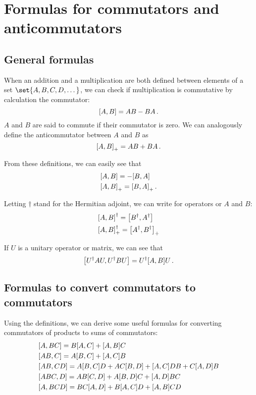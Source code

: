 \section{Formulas for commutators and anticommutators}
    \subsection{General formulas}
        When an addition and a multiplication are both defined between elements of a set $\set{A, B, C, D, \dots}$, we can check if multiplication is commutative by calculation the commutator:
        \begin{equation}
            \comm{A}{B} = AB - BA \thinspace .
        \end{equation}
        $A$ and $B$ are said to commute if their commutator is zero. We can analogously define the anticommutator between $A$ and $B$ as
        \begin{equation}
            \comm{A}{B}_+ = AB + BA \thinspace .
        \end{equation}

        From these definitions, we can easily see that
        \begin{align}
            & \comm{A}{B} = - \comm{B}{A} \\
            & \comm{A}{B}_+ = \comm{B}{A}_+ \thinspace .
        \end{align}

        Letting $\dagger$ stand for the Hermitian adjoint, we can write for operators or $A$ and $B$:
        \begin{align}
            & \comm{A}{B}^\dagger = \comm{B^\dagger}{A^\dagger} \\
            & \comm{A}{B}^\dagger_+ = \comm{A^\dagger}{B^\dagger}_+
        \end{align}

        If $U$ is a unitary operator or matrix, we can see that
        \begin{equation}
            \comm{U^\dagger A U}{U^\dagger B U } = U^\dagger \comm{A}{B} U \thinspace .
        \end{equation}

    \subsection{Formulas to convert commutators to commutators}
        Using the definitions, we can derive some useful formulas for converting commutators of products to sums of commutators:
        \begin{align}
            & \comm{A}{BC} = B \comm{A}{C} + \comm{A}{B} C \\
            & \comm{AB}{C} = A \comm{B}{C} + \comm{A}{C}B \\
            & \comm{AB}{CD} = A \comm{B}{C} D + AC \comm{B}{D} + \comm{A}{C} DB + C \comm{A}{D} B \\
            & \comm{ABC}{D} = AB \comm{C}{D} + A \comm{B}{D} C + \comm{A}{D} BC \\
            & \comm{A}{BCD} = BC \comm{A}{D} + B \comm{A}{C} D + \comm{A}{B} CD
        \end{align}

